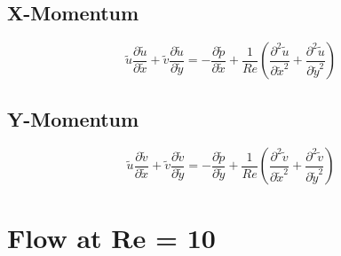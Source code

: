 \documentclass[11pt]{article}
\begin{document}
\subsection*{X-Momentum}
\begin{equation*}
    \tilde{u} \frac{\partial \tilde{u}}{\partial \tilde{x}} + \tilde{v} \frac{\partial \tilde{u}}{\partial \tilde{y}} = -\frac{\partial \tilde{p}}{\partial \tilde{x}} + \frac{1}{Re}\left(\frac{\partial^2 \tilde{u}}{\partial \tilde{x}^2} + \frac{\partial^2 \tilde{u}}{\partial \tilde{y}^2}\right)
\end{equation*}

\subsection*{Y-Momentum}
\begin{equation*}
    \tilde{u} \frac{\partial \tilde{v}}{\partial \tilde{x}} + \tilde{v} \frac{\partial \tilde{v}}{\partial \tilde{y}} = -\frac{\partial \tilde{p}}{\partial \tilde{y}} + \frac{1}{Re}\left(\frac{\partial^2 \tilde{v}}{\partial \tilde{x}^2} + \frac{\partial^2 \tilde{v}}{\partial \tilde{y}^2}\right)
\end{equation*}

\pagebreak



\section{Flow at Re = 10}
\end{document}
